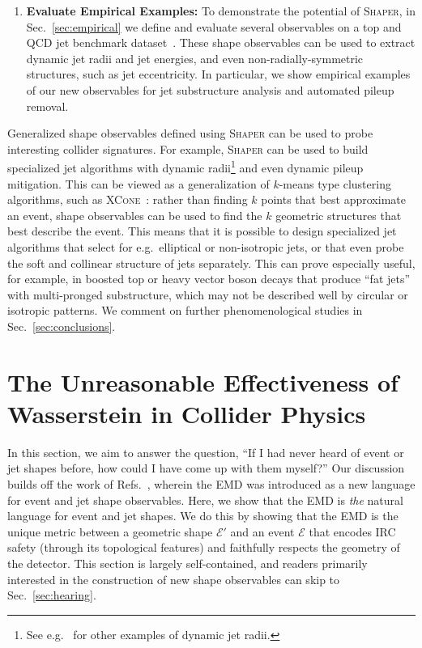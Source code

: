 \documentclass[letterpaper,11pt]{article}
\newcommand{\E}{\mathcal{E}}
\DeclareRobustCommand{\Sec}[1]{Sec.~\ref{sec:#1}}
\DeclareRobustCommand{\Refers}[1]{Refs.~\cite{#1}}
\newcommand{\Shaper}{\textsc{Shaper}\xspace}
\begin{document}
\begin{enumerate}
    \item \textbf{Evaluate Empirical Examples:}
    To demonstrate the potential of \Shaper, in \Sec{empirical} we define and evaluate several observables on a top and QCD jet benchmark dataset~\cite{Butter:2017cot,Kasieczka:2019dbj}.
    These shape observables can be used to extract dynamic jet radii and jet energies, and even non-radially-symmetric structures, such as jet eccentricity.
    In particular, we show empirical examples of our new observables for jet substructure analysis and automated pileup removal.
\end{enumerate}


Generalized shape observables defined using \Shaper can be used to probe interesting collider signatures.
For example, \Shaper can be used to build specialized jet algorithms with dynamic radii\footnote{See e.g.~\cite{Krohn:2009zg, Mackey:2015hwa, Mukhopadhyaya:2023rsb, Larkoski:2023nye} for other examples of dynamic jet radii.} and even dynamic pileup mitigation.
%
This can be viewed as a generalization of $k$-means type clustering algorithms, such as \textsc{XCone}~\cite{Stewart:2015waa}: rather than finding $k$ points that best approximate an event, shape observables can be used to find the $k$ geometric structures that best describe the event.
%
This means that it is possible to design specialized jet algorithms that select for e.g.\ elliptical or non-isotropic jets, or that even probe the soft and collinear structure of jets separately.
%
This can prove especially useful, for example, in boosted top or heavy vector boson decays that produce ``fat jets'' with multi-pronged substructure, which may not be described well by circular or isotropic patterns. 
%
We comment on further phenomenological studies in \Sec{conclusions}.




\section{The Unreasonable Effectiveness of Wasserstein in Collider Physics}\label{sec:EMD}

In this section, we aim to answer the question, ``If I had never heard of event or jet shapes before, how could I have come up with them myself?'' 
%
Our discussion builds off the work of \Refers{Komiske_2019, 2020}, wherein the EMD was introduced as a new language for event and jet shape observables.
%
Here, we show that the EMD is \emph{the} natural language for event and jet shapes. 
%
We do this by showing that the EMD is the unique metric between a geometric shape $\E'$ and an event $\E$ that encodes IRC safety (through its topological features) and faithfully respects the geometry of the detector.
%
This section is largely self-contained, and readers primarily interested in the construction of new shape observables can skip to \Sec{hearing}.
\end{document}
